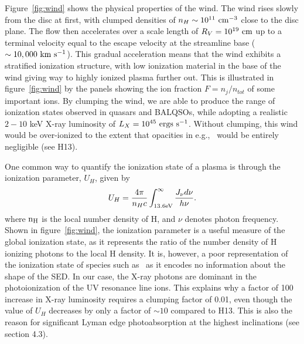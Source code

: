 \documentclass[useAMS,usenatbib]{mn2e_x}
\begin{document}
Figure~\ref{fig:wind} shows the physical properties of the wind.
The wind rises slowly from the disc at first, with clumped densities
of $n_H \sim 10^{11}~\rm{cm^{-3}}$ close to the disc plane.
The flow then accelerates over a scale length of $R_V=10^{19}~\rm{cm}$
up to a terminal velocity equal to the escape velocity at the streamline base
($\sim10,000~\rm{km~s^{-1}}$). This gradual acceleration means that
the wind exhibits a stratified ionization structure, with low ionization material
in the base of the wind giving way to highly ionized plasma further out.
This is illustrated in figure~\ref{fig:wind} 
by the panels showing the ion fraction $F=n_j/n_{tot}$ of some important ions.
By clumping the wind, we are able to produce the range of ionization states observed
in quasars and BALQSOs, while adopting a realistic $2-10$ keV X-ray luminosity
of $L_{X}=10^{45}~\rm{ergs~s^{-1}}$. Without clumping, this wind would be over-ionized 
to the extent that opacities in e.g., \civ\ would be entirely negligible (see H13).

One common way to quantify the ionization state of a plasma
is through the ionization parameter, $U_H$, given by
\begin{equation}
U_H = \frac{4\pi}{n_H c}\int_{13.6{\rm{eV}}}^{\infty}\frac{{J_{\nu}d\nu}}{h\nu}.
\end{equation}
\noindent where $\rm{n_H}$ is the local number density of H, and $\nu$ denotes photon 
frequency. Shown in figure~\ref{fig:wind},
the ionization parameter is a useful measure of the global ionization state,
as it represents the ratio of the number density of 
H ionizing photons to the local H density.
It is, however, a poor representation of the 
ionization state of species such as \civ\ as it encodes no information
about the shape of the SED. In our case, the X-ray photons 
are dominant in the photoionization of the UV resonance line ions. 
This explains why a factor of 100 increase in X-ray luminosity requires
a clumping factor of 0.01, even though the value of $U_H$ decreases by only a factor of $\sim10$ 
compared to H13. This is also the reason for significant Lyman edge photoabsorption
at the highest inclinations (see section 4.3).
\end{document}
